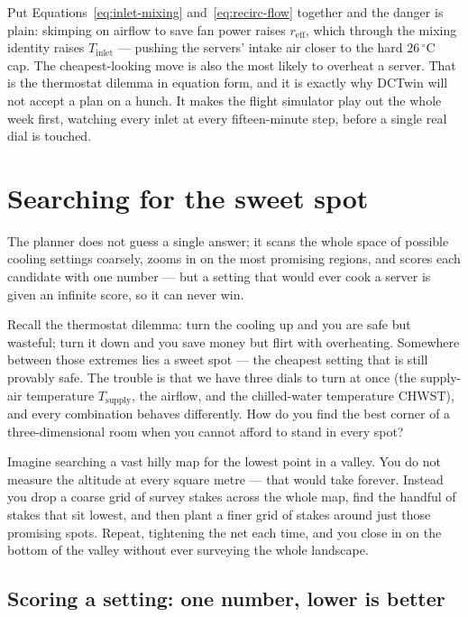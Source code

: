 \documentclass[11pt]{report}
\begin{document}
Put Equations~\ref{eq:inlet-mixing} and~\ref{eq:recirc-flow} together and the danger is plain: skimping on airflow to save fan power raises $r_{\text{eff}}$, which through the mixing identity raises $T_{\text{inlet}}$ --- pushing the servers' intake air closer to the hard $26\,^\circ$C cap. The cheapest-looking move is also the most likely to overheat a server. That is the thermostat dilemma in equation form, and it is exactly why DCTwin will not accept a plan on a hunch. It makes the flight simulator play out the whole week first, watching every inlet at every fifteen-minute step, before a single real dial is touched.

\section{Searching for the sweet spot}
\label{sec:search}

\begin{keyidea}
The planner does not guess a single answer; it scans the whole space of possible cooling settings coarsely, zooms in on the most promising regions, and scores each candidate with one number --- but a setting that would ever cook a server is given an infinite score, so it can never win.
\end{keyidea}

Recall the thermostat dilemma: turn the cooling up and you are safe but wasteful; turn it down and you save money but flirt with overheating. Somewhere between those extremes lies a sweet spot --- the cheapest setting that is still provably safe. The trouble is that we have three dials to turn at once (the supply-air temperature $T_{\text{supply}}$, the airflow, and the chilled-water temperature CHWST), and every combination behaves differently. How do you find the best corner of a three-dimensional room when you cannot afford to stand in every spot?

\begin{analogy}
Imagine searching a vast hilly map for the lowest point in a valley. You do not measure the altitude at every square metre --- that would take forever. Instead you drop a coarse grid of survey stakes across the whole map, find the handful of stakes that sit lowest, and then plant a finer grid of stakes around just those promising spots. Repeat, tightening the net each time, and you close in on the bottom of the valley without ever surveying the whole landscape.
\end{analogy}

\subsection{Scoring a setting: one number, lower is better}
\end{document}
